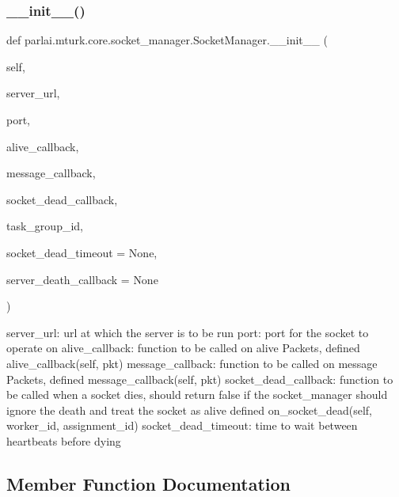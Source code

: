 \subsubsection{\texorpdfstring{\+\_\+\+\_\+init\+\_\+\+\_\+()}{\_\_init\_\_()}}
{\footnotesize\ttfamily def parlai.\+mturk.\+core.\+socket\+\_\+manager.\+Socket\+Manager.\+\_\+\+\_\+init\+\_\+\+\_\+ (\begin{DoxyParamCaption}\item[{}]{self,  }\item[{}]{server\+\_\+url,  }\item[{}]{port,  }\item[{}]{alive\+\_\+callback,  }\item[{}]{message\+\_\+callback,  }\item[{}]{socket\+\_\+dead\+\_\+callback,  }\item[{}]{task\+\_\+group\+\_\+id,  }\item[{}]{socket\+\_\+dead\+\_\+timeout = {\ttfamily None},  }\item[{}]{server\+\_\+death\+\_\+callback = {\ttfamily None} }\end{DoxyParamCaption})}

\begin{DoxyVerb}server_url:           url at which the server is to be run
port:                 port for the socket to operate on
alive_callback:       function to be called on alive Packets, defined
               alive_callback(self, pkt)
message_callback:     function to be called on message Packets, defined
               message_callback(self, pkt)
socket_dead_callback: function to be called when a socket dies, should
              return false if the socket_manager should ignore
              the death and treat the socket as alive defined
               on_socket_dead(self, worker_id, assignment_id)
socket_dead_timeout:  time to wait between heartbeats before dying
\end{DoxyVerb}
 

\subsection{Member Function Documentation}
\mbox{\label{classparlai_1_1mturk_1_1core_1_1socket__manager_1_1SocketManager_a1518f69049fee8c6afb27120cdd6b1f3}} 
